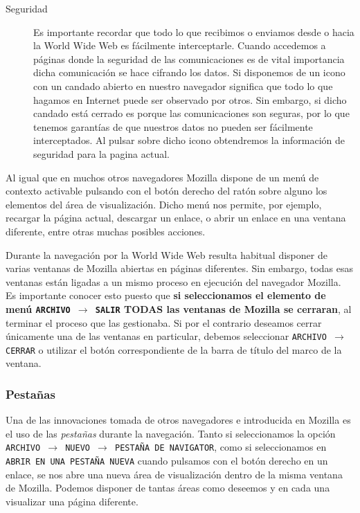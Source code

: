 \begin{description}
\item[Seguridad] Es  importante recordar que  todo lo que  recibimos o
enviamos desde o hacia la  World Wide Web es fácilmente interceptarle.
Cuando accedemos a páginas donde la seguridad de las comunicaciones es
de vital importancia dicha comunicación se hace cifrando los datos.
Si disponemos de un icono con  un candado abierto en nuestro navegador
significa que todo lo que hagamos  en Internet puede ser observado por
otros.  Sin embargo,  si  dicho  candado está  cerrado  es porque  las
comunicaciones  son  seguras, por  lo  que  tenemos garantías  de  que
nuestros datos no pueden ser fácilmente interceptados. Al pulsar sobre
dicho icono  obtendremos la  información de  seguridad para  la pagina
actual.

\end{description}

Al igual que  en muchos otros navegadores {\sf Mozilla}  dispone de un
menú de  contexto activable  pulsando con el  botón derecho  del ratón
sobre alguno los  elementos del área de visualización.  Dicho menú nos
permite, por ejemplo, recargar la  página actual, descargar un enlace,
o  abrir  un enlace  en  una  ventana  diferente, entre  otras  muchas
posibles acciones.

Durante la navegación por la  World Wide Web resulta habitual disponer
de varias  ventanas de {\sf  Mozilla} abiertas en  páginas diferentes.
Sin embargo, todas  esas ventanas están ligadas a un  mismo proceso en
ejecución  del navegador  {\sf  Mozilla}. Es  importante conocer  esto
puesto  que {\bf  si seleccionamos  el elemento  de menú  {\tt ARCHIVO
$\rightarrow$ SALIR} TODAS las ventanas de {\sf Mozilla} se cerraran},
al  terminar  el proceso  que  las  gestionaba.  Si por  el  contrario
deseamos cerrar únicamente una de  las ventanas en particular, debemos
seleccionar  {\tt ARCHIVO  $\rightarrow$ CERRAR}  o utilizar  el botón
correspondiente de la barra de título del marco de la ventana.

\subsubsection{Pestañas}

Una de las  innovaciones tomada de otros navegadores  e introducida en
{\sf Mozilla} es  el uso de las {\em pestañas}  durante la navegación.
Tanto  si seleccionamos  la  opción {\tt  ARCHIVO $\rightarrow$  NUEVO
$\rightarrow$  PESTAÑA DE  NAVIGATOR}, como  si seleccionamos  en {\tt
ABRIR EN UNA PESTAÑA NUEVA} cuando pulsamos con el botón derecho en un
enlace, se nos abre una nueva área de visualización dentro de la misma
ventana  de  {\sf Mozilla}.  Podemos  disponer  de tantas  áreas  como
deseemos y en cada una visualizar una página diferente.

